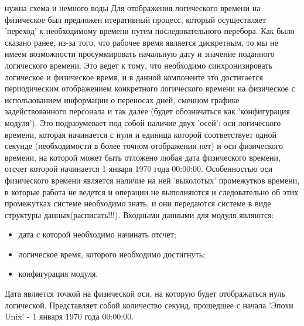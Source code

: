 нужна схема и немного воды
Для отображения логического времени на физическое был предложен итеративный процесс, который осуществляет 'переход' к необходимому времени путем последовательного перебора.
\newline
Как было сказано ранее, из-за того, что рабочее время является дискретным, то мы не имеем возможности просуммировать начальную дату и значение поданного логического времени. Это ведет к тому, что необходимо синхронизировать логическое и физическое время, и в данной компоненте это достигается периодическим отображением конкретного логического времени на физическое с использованием информации о переносах дней, сменном графике задействованного персонала и так далее (будет обозначаться как 'конфигурация модуля').
\newline
Это подразумевает под собой наличие двух 'осей': оси логического времени, которая начинается с нуля и единица которой соответствует одной секунде (необходимости в более точном отображении нет) и оси физического времени, на которой может быть отложено любая дата физического времени, отсчет которой начинается 1 января 1970 года 00:00:00. Особенностью оси физического времени является наличие на ней 'выколотых' промежутков времени, в которые работа не ведется и операции не выполняются и следовательно об этих промежутках системе необходимо знать, и они передаются системе в виде структуры данных(расписать!!!).
\newline
Входными данными для модуля являются:
\begin{itemize}
	\item дата с которой необходимо начинать отсчет;
	\item логическое время, которого необходимо достигнуть;
	\item конфигурация модуля.
\end{itemize}
Дата является точкой на физической оси, на которую будет отображаться нуль логической. Представляет собой количество секунд, прошедшее с начала 'Эпохи Unix' - 1 января 1970 года 00:00:00.
